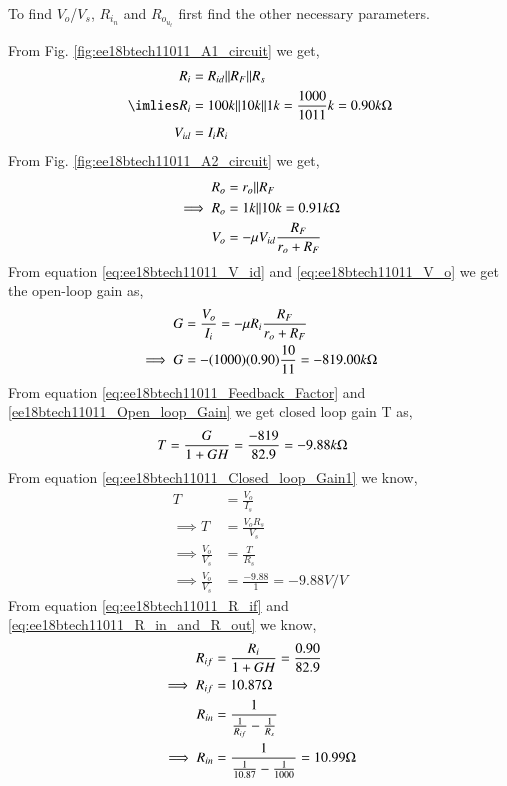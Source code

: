 \begin{enumerate}[label=\thesection.\arabic*.,ref=\thesection.\theenumi]
\solution To find $V_o$/$V_s$, $R_i_n$ and $R_o_u_t$ first find the other necessary parameters.

From Fig. \ref{fig:ee18btech11011_A1_circuit} we get,
%
\begin{align}
R_{i} &= R_{i d}\|R_{F}\|R_{s} 
\\
\label{ee18btech11011_R_i}
\imlies R_{i} &= 100k\|10k\|1k = \frac{1000}{1011}k = 0.90k\ohm
\\
\label{eq:ee18btech11011_V_id}
V_{i d} &= I_{i}R_{i}
\end{align}
%
From Fig. \ref{fig:ee18btech11011_A2_circuit} we get,
%
\begin{align}
R_{o} &= r_{o}\|R_{F}
\\
\label{ee18btech11011_R_o}
\implies R_{o} &= 1k\|10k = 0.91k\ohm
\\
\label{eq:ee18btech11011_V_o}
V_{o} &= -\mu V_{i d}\frac{R_{F}}{r_{o} + R_{F}}
\end{align}
%
From equation \ref{eq:ee18btech11011_V_id} and \ref{eq:ee18btech11011_V_o} we get the open-loop gain as,
%
\begin{align}
G &= \frac{V_{o}}{I_{i}} = -\mu R_{i}\frac{R_{F}}{r_{o} + R_{F}}
\\
\label{ee18btech11011_Open_loop_Gain}
\implies G &= -(1000)(0.90)\frac{10}{11} = -819.00k\ohm
\end{align}
%
From equation \ref{eq:ee18btech11011_Feedback_Factor} and \ref{ee18btech11011_Open_loop_Gain} we get closed loop gain T as,
%
\begin{align}
T &= \frac{G}{1+GH} = \frac{-819}{82.9} = -9.88k\ohm
\end{align}
%
From equation \ref{eq:ee18btech11011_Closed_loop_Gain1} we know,
\begin{align}
T &= \frac{V_{o}}{I_{s}}
\\
\implies T &= \frac{V_{o}R_{s}}{V_{s}}
\\
\implies \frac{V_{o}}{V_{s}} &= \frac{T}{R_{s}} 
\\
\implies \frac{V_{o}}{V_{s}} &= \frac{-9.88}{1} = -9.88V/V
\end{align}
From equation \ref{eq:ee18btech11011_R_if} and \ref{eq:ee18btech11011_R_in_and_R_out} we know,
%
\begin{align}
R_{i f} &= \frac{R_{i}}{1+GH} = \frac{0.90}{82.9}
\\
\implies R_{i f} &= 10.87\ohm
\\
R_{i n} &= \frac{1}{\frac{1}{R_{i f}} - \frac{1}{R_{s}}}
\\
\implies R_{i n} &= \frac{1}{\frac{1}{10.87} - \frac{1}{1000}} = 10.99\ohm

\end{align}
\end{enumerate}
